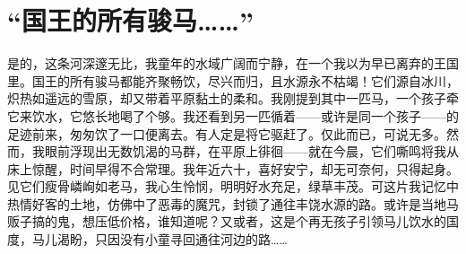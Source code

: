 \section{“国王的所有骏马……”}

是的，这条河深邃无比，我童年的水域广阔而宁静，在一个我以为早已离弃的王国里。国王的所有骏马都能齐聚畅饮，尽兴而归，且水源永不枯竭！它们源自冰川，炽热如遥远的雪原，却又带着平原黏土的柔和。我刚提到其中一匹马，一个孩子牵它来饮水，它悠长地喝了个够。我还看到另一匹循着——或许是同一个孩子——的足迹前来，匆匆饮了一口便离去。有人定是将它驱赶了。仅此而已，可说无多。然而，我眼前浮现出无数饥渴的马群，在平原上徘徊——就在今晨，它们嘶鸣将我从床上惊醒，时间早得不合常理。我年近六十，喜好安宁，却无可奈何，只得起身。见它们瘦骨嶙峋如老马，我心生怜悯，明明好水充足，绿草丰茂。可这片我记忆中热情好客的土地，仿佛中了恶毒的魔咒，封锁了通往丰饶水源的路。或许是当地马贩子搞的鬼，想压低价格，谁知道呢？又或者，这是个再无孩子引领马儿饮水的国度，马儿渴盼，只因没有小童寻回通往河边的路……